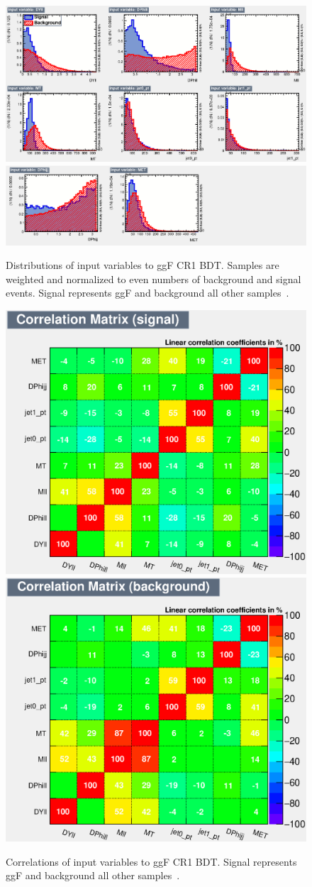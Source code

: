 \begin{figure}[!htbp]
    \centering
    \includegraphics[width=0.70\linewidth]{Pictures/ggFCR1/variables_id_c1.eps}
    \includegraphics[width=0.70\linewidth]{Pictures/ggFCR1/variables_id_c2.eps}
    \caption{Distributions of input variables to ggF CR1 BDT. Samples are weighted and normalized to even numbers of background and signal events. Signal represents ggF and background all other samples~\cite{ourSupportNote}.}
    \label{fig:ggFCR1BDTinput}
\end{figure}
\begin{figure}[!htbp]
\centering
  \includegraphics[width=.45\linewidth]{Pictures/ggFCR1/CorrelationMatrixS.eps}
  \includegraphics[width=.45\linewidth]{Pictures/ggFCR1/CorrelationMatrixB.eps}
\caption{Correlations of input variables to ggF CR1 BDT. Signal represents ggF and background all other samples~\cite{ourSupportNote}.}
\label{fig:ggFCR1corrSB}
\end{figure}

